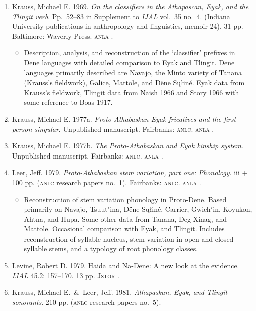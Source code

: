 \documentclass[12pt,letterpaper,oneside,article]{memoir}
\begin{document}
\begin{enumerate}
\begin{itemize}
	\end{itemize}
\item	Krauss, Michael E.
	1969.
	\textit{On the classifiers in the Athapascan, Eyak, and the Tlingit verb}.
	Pp.\ 52–83 in Supplement to \textit{IJAL}
	vol.\ 35 no.\ 4.
	(Indiana University publications in anthropology and linguistics, memoir 24).
	31 pp.
	Baltimore: Waverly Press.
	\textsc{anla} .
	\begin{itemize}
	\item	Description, analysis, and reconstruction of the ‘classifier’
		prefixes in Dene languages with detailed comparison to Eyak
		and Tlingit.
		Dene languages primarily described are Navajo, the Minto variety
		of Tanana (Krauss’s fieldwork), Galice, Mattole, and Dëne Sųłiné.
		Eyak data from Krauss’s fieldwork, Tlingit data from Naish 1966
		and Story 1966 with some reference to Boas 1917.
	\end{itemize}
\item	Krauss, Michael E. 1977a.
	\textit{Proto-Athabaskan-Eyak fricatives and the first person singular}.
	Unpublished manuscript.
	Fairbanks: \textsc{anlc}.
	\textsc{anla} .
\item	Krauss, Michael E. 1977b.
	\textit{The Proto-Athabaskan and Eyak kinship system}.
	Unpublished manuscript.
	Fairbanks: \textsc{anlc}.
	\textsc{anla} .
\item	Leer, Jeff.
	1979.
	\textit{Proto-Athabaskan stem variation, part one: Phonology}.
	iii + 100 pp.
	(\textsc{anlc} research papers no.\ 1).
	Fairbanks: \textsc{anlc}.
	\textsc{anla} .
	\begin{itemize}
	\item	Reconstruction of stem variation phonology in Proto-Dene.
		Based primarily on Navajo, Tsuutʼina, Dëne Sųłiné, Carrier, Gwichʼin,
		Koyukon, Ahtna, and Hupa. Some other data from Tanana, Deg Xinag,
		and Mattole. Occasional comparison with Eyak, and Tlingit.
		Includes reconstruction of syllable nucleus, stem variation
		in open and closed syllable stems, and a typology of root
		phonology classes.
	\end{itemize}
\item	Levine, Robert D.
	1979.
	Haida and Na-Dene: A new look at the evidence.
	\textit{IJAL} 45.2: 157–170.
	13 pp.
	\textsc{Jstor} .
\item	Krauss, Michael E.\ \&\ Leer, Jeff.
	1981.
	\textit{Athapaskan, Eyak, and Tlingit sonorants}.
	210 pp.
	(\textsc{anlc} research papers no.\ 5).

\end{enumerate}
\end{document}
